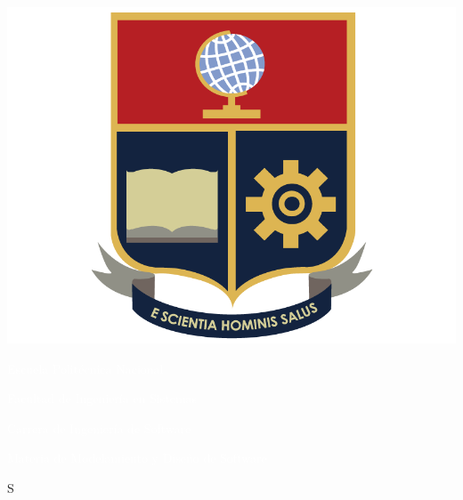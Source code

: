 \documentclass[12pt, a4paper]{article}
\begin{document}
\BgThispage
\begin{multicols}{2}
    \begin{center}
        \includegraphics[scale=0.09]{logo-epn.png}
    \end{center}
    \vfill\null
    \columnbreak
    \par
    \noindent
    \textcolor{white}{Escuela Politécnica Nacional} \par
    \textcolor{white}{Facultad de Ingeniería en Sistemas} \par
    \textcolor{white}{Carrera de Ingeniería de Software} \par
    \textcolor{white}{Materia de Modelamiento y Diseño de Software}
    \vfill\null
    \columnbreak
\end{multicols}

S
\end{document}

